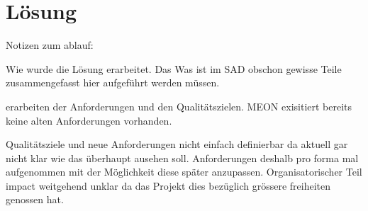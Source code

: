\chapter{Lösung}

Notizen zum ablauf:

Wie wurde die Lösung erarbeitet. Das Was ist im SAD obschon gewisse Teile zusammengefasst hier aufgeführt werden müssen.

erarbeiten der Anforderungen und den Qualitätszielen. MEON exisitiert bereits keine alten Anforderungen vorhanden. 

Qualitätsziele und neue Anforderungen nicht einfach definierbar da aktuell gar nicht klar wie das überhaupt ausehen soll. Anforderungen deshalb pro forma mal aufgenommen mit der Möglichkeit diese später anzupassen.
Organisatorischer Teil impact weitgehend unklar da das Projekt dies bezüglich grössere freiheiten genossen hat. 